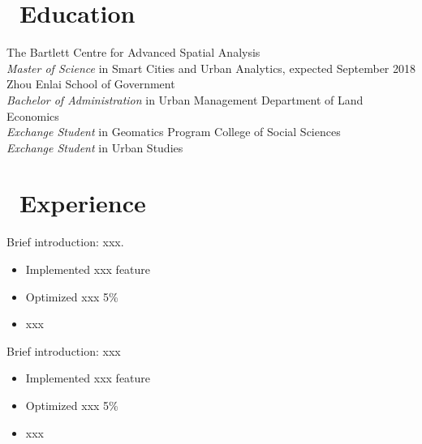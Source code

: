\documentclass{resume}
\begin{document}



\section{\faGraduationCap\ Education}
The Bartlett Centre for Advanced Spatial Analysis\\
\textit{Master of Science} in Smart Cities and Urban Analytics, expected September 2018
Zhou Enlai School of Government\\
\textit{Bachelor of Administration} in Urban Management
Department of Land Economics\\
\textit{Exchange Student} in Geomatics Program
College of Social Sciences\\
\textit{Exchange Student} in Urban Studies

\section{\faUsers\ Experience}
Brief introduction: xxx.
\begin{itemize}
  \item Implemented xxx feature
  \item Optimized xxx 5\%
  \item xxx
\end{itemize}

Brief introduction: xxx
\begin{itemize}
  \item Implemented xxx feature
  \item Optimized xxx 5\%
  \item xxx
\end{itemize}
\end{document}
